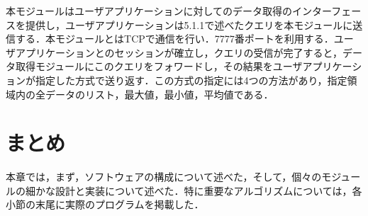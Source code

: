 % 
%
本モジュールはユーザアプリケーションに対してのデータ取得のインターフェースを提供し，ユーザアプリケーションは5.1.1で述べたクエリを本モジュールに送信する．本モジュールとはTCPで通信を行い．7777番ポートを利用する．ユーザアプリケーションとのセッションが確立し，クエリの受信が完了すると，データ取得モジュールにこのクエリをフォワードし，その結果をユーザアプリケーションが指定した方式で送り返す．この方式の指定には4つの方法があり，指定領域内の全データのリスト，最大値，最小値，平均値である．


\section{まとめ}
本章では，まず，ソフトウェアの構成について述べた，そして，個々のモジュールの細かな設計と実装について述べた．特に重要なアルゴリズムについては，各小節の末尾に実際のプログラムを掲載した．
